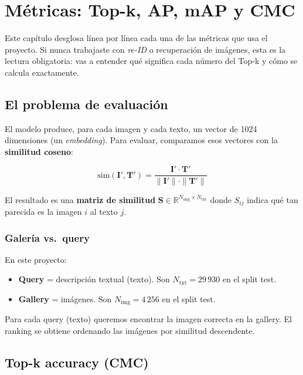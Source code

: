 \chapter{Métricas: Top-k, AP, mAP y CMC}
\label{cap:metricas}

Este capítulo desglosa línea por línea cada una de las métricas
que usa el proyecto. Si nunca trabajaste con \emph{re-ID} o
recuperación de imágenes, esta es la lectura obligatoria: vas a
entender qué significa cada número del Top-k y cómo se calcula
exactamente.

\section{El problema de evaluación}

El modelo produce, para cada imagen y cada texto, un vector de
1024 dimensiones (un \emph{embedding}). Para evaluar, comparamos
esos vectores con la \textbf{similitud coseno}:

\begin{equation}
  \text{sim}(\mathbf{I}', \mathbf{T}') =
  \frac{\mathbf{I}' \cdot \mathbf{T}'}
       {\|\mathbf{I}'\| \cdot \|\mathbf{T}'\|}
  \label{eq:sim-cos}
\end{equation}

El resultado es una \textbf{matriz de similitud}
$\mathbf{S} \in \mathbb{R}^{N_{\text{img}} \times N_{\text{txt}}}$
donde $S_{ij}$ indica qué tan parecida es la imagen $i$ al
texto $j$.

\subsection*{Galería vs.\ query}

En este proyecto:
\begin{itemize}
  \item \textbf{Query} = descripción textual (texto).
        Son $N_{\text{txt}} = 29\,930$ en el split test.
  \item \textbf{Gallery} = imágenes.
        Son $N_{\text{img}} = 4\,256$ en el split test.
\end{itemize}

Para cada query (texto) queremos encontrar la imagen correcta
en la gallery. El ranking se obtiene ordenando las imágenes por
similitud descendente.

\section{Top-k accuracy (CMC)}

